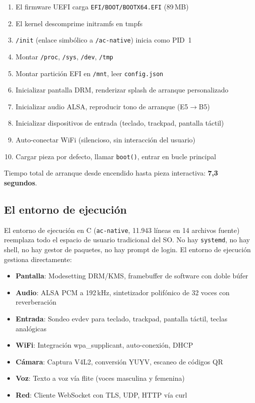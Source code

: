 \documentclass[10pt,letterpaper,twocolumn]{article}
\begin{document}
\begin{enumerate}
  \item El firmware UEFI carga \texttt{EFI/BOOT/BOOTX64.EFI} (89\,MB)
  \item El kernel descomprime initramfs en tmpfs
  \item \texttt{/init} (enlace simbólico a \texttt{/ac-native}) inicia como PID~1
  \item Montar \texttt{/proc}, \texttt{/sys}, \texttt{/dev}, \texttt{/tmp}
  \item Montar partición EFI en \texttt{/mnt}, leer \texttt{config.json}
  \item Inicializar pantalla DRM, renderizar splash de arranque personalizado
  \item Inicializar audio ALSA, reproducir tono de arranque (E5$\rightarrow$B5)
  \item Inicializar dispositivos de entrada (teclado, trackpad, pantalla táctil)
  \item Auto-conectar WiFi (silencioso, sin interacción del usuario)
  \item Cargar pieza por defecto, llamar \texttt{boot()}, entrar en bucle principal
\end{enumerate}

Tiempo total de arranque desde encendido hasta pieza interactiva: \textbf{7,3 segundos}.

\subsection{El entorno de ejecución}

El entorno de ejecución en C (\texttt{ac-native}, 11.943 líneas en 14 archivos fuente) reemplaza todo el espacio de usuario tradicional del SO. No hay \texttt{systemd}, no hay shell, no hay gestor de paquetes, no hay prompt de login. El entorno de ejecución gestiona directamente:

\begin{itemize}
  \item \textbf{Pantalla}: Modesetting DRM/KMS, framebuffer de software con doble búfer
  \item \textbf{Audio}: ALSA PCM a 192\,kHz, sintetizador polifónico de 32 voces con reverberación
  \item \textbf{Entrada}: Sondeo evdev para teclado, trackpad, pantalla táctil, teclas analógicas
  \item \textbf{WiFi}: Integración wpa\_supplicant, auto-conexión, DHCP
  \item \textbf{Cámara}: Captura V4L2, conversión YUYV, escaneo de códigos QR
  \item \textbf{Voz}: Texto a voz vía flite (voces masculina y femenina)
  \item \textbf{Red}: Cliente WebSocket con TLS, UDP, HTTP vía curl
\end{itemize}
\end{document}
